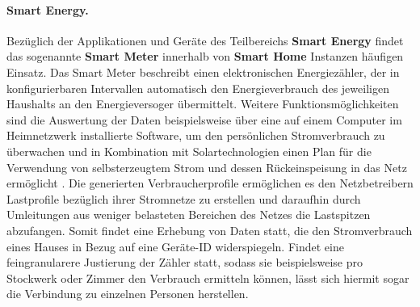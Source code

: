 \paragraph{Smart Energy.}
\label{sec:Analyse der Datenerhebung:ssec:Smart City:para:Smart Energy}
Bezüglich der Applikationen und Geräte des Teilbereichs \textbf{Smart Energy} findet das sogenannte \textbf{Smart Meter} innerhalb von \textbf{Smart Home} Instanzen häufigen Einsatz. Das Smart Meter beschreibt einen elektronischen Energiezähler, der in konfigurierbaren Intervallen automatisch den Energieverbrauch des jeweiligen Haushalts an den Energieversoger übermittelt. Weitere Funktionsmöglichkeiten sind die Auswertung der Daten beispielsweise über eine auf einem Computer im Heimnetzwerk installierte Software, um den persönlichen Stromverbrauch zu überwachen und in Kombination mit Solartechnologien einen Plan für die Verwendung von selbsterzeugtem Strom und dessen Rückeinspeisung in das Netz ermöglicht \cite{fox2010smart}. Die generierten Verbraucherprofile ermöglichen es den Netzbetreibern Lastprofile bezüglich ihrer Stromnetze zu erstellen und daraufhin durch Umleitungen aus weniger belasteten Bereichen des Netzes die Lastspitzen abzufangen. Somit findet eine Erhebung von Daten statt, die den Stromverbrauch eines Hauses in Bezug auf eine Geräte-ID widerspiegeln. Findet eine feingranularere Justierung der Zähler statt, sodass sie beispielsweise pro Stockwerk oder Zimmer den Verbrauch ermitteln können, lässt sich hiermit sogar die Verbindung zu einzelnen Personen herstellen.\\
